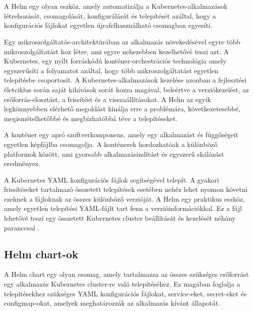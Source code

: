 \chapter{\helm}
A Helm egy olyan eszköz, amely automatizálja a Kubernetes-alkalmazások létrehozását, csomagolását, konfigurálását és telepítését azáltal, hogy a konfigurációs fájlokat egyetlen újrafelhasználható csomagban egyesíti.

Egy mikroszolgáltatás-architektúrában az alkalmazás növekedésével egyre több mikroszolgáltatást hoz létre, ami egyre nehezebben kezelhetővé teszi azt.
A Kubernetes, egy nyílt forráskódú konténer-orchestrációs technológia amely egyszerűsíti a folyamatot azáltal, hogy több mikroszolgáltatást egyetlen telepítésbe csoportosít.
A Kubernetes-alkalmazások kezelése azonban a fejlesztési életciklus során saját kihívások sorát hozza magával, beleértve a verziókezelést, az erőforrás-elosztást, a frissítést és a visszaállításokat.
A Helm az egyik legkönnyebben elérhető megoldást kínálja erre a problémára, következetesebbé, megismételhetőbbé és megbízhatóbbá téve a telepítéseket.

A konténer egy apró szoftverkomponens, amely egy alkalmazást és függőségeit egyetlen képfájlba csomagolja.
A konténerek hordozhatóak a különböző platformok között, ami gyorsabb alkalmazásindítást és egyszerű skálázást eredményez.

A Kubernetes YAML konfigurációs fájlok segítségével telepít.
A gyakori frissítéseket tartalmazó összetett telepítések esetében nehéz lehet nyomon követni ezeknek a fájloknak az összes különböző verzióját.
A Helm egy praktikus eszköz, amely egyetlen telepítési YAML-fájlt tart fenn a verzióinformációkkal.
Ez a fájl lehetővé teszi egy összetett Kubernetes cluster beállítását és kezelését néhány paranccsal \cite{helm}.

\section{Helm chart-ok}
A Helm chart egy olyan csomag, amely tartalmazza az összes szükséges erőforrást egy alkalmazás Kubernetes cluster-re való telepítéséhez.
Ez magában foglalja a telepítésekhez szükséges YAML konfigurációs fájlokat, service-eket, secret-eket és configmap-okat, amelyek meghatározzák az alkalmazás kívánt állapotát.

